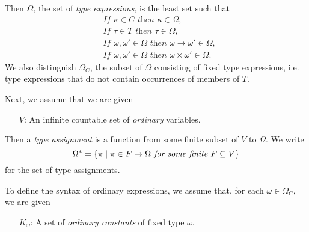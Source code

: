 \documentclass[sigplan,screen,nonacm,balance=false]{acmart}
\makeatletter
\theoremstyle{plain}
\DeclarePairedDelimiter{\set}{\{}{\}}
\newcommand{\ie}{i.e.\@\xspace}
\makeatother
\begin{document}
Then $\Omega$, the set of \emph{type expressions}, is the least set such that
%
\begin{align}
  \tag{$\Omega 1$}
  &\textit{If } \kappa \in C \textit{ then } \kappa \in \Omega, \\
  \tag{$\Omega 2$}
  &\textit{If } \tau \in T \textit{ then } \tau \in \Omega, \\
  \tag{$\Omega 3$}
  &\textit{If } \omega, \omega' \in \Omega \textit{ then } \omega \to \omega' \in \Omega, \\
  \tag{$\Omega 4$}
  &\textit{If } \omega, \omega' \in \Omega \textit{ then } \omega \times \omega' \in \Omega.
\end{align}
%
We also distinguish $\Omega_C$, the subset of $\Omega$ consisting of fixed type expressions, \ie type expressions that do not contain occurrences of members of $T$.

Next, we assume that we are given

\begin{itemize}[noitemsep,leftmargin=3em]
  \item[$V$:] An infinite countable set of \emph{ordinary} variables.
\end{itemize}

Then a \emph{type assignment} is a function from some finite subset of $V$ to $\Omega$.
We write
%
\begin{equation*}
  \Omega^* = \set{\pi \mid \pi \in F \to \Omega \textit{ for some finite } F \subseteq V}
\end{equation*}
%
for the set of type assignments.

To define the syntax of ordinary expressions, we assume that, for each $\omega \in \Omega_C$, we are given

\begin{itemize}[noitemsep,leftmargin=3em]
  \item[$K_\omega$:] A set of \emph{ordinary constants} of fixed type $\omega$.
\end{itemize}
\end{document}
